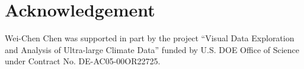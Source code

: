 
\section*{Acknowledgement}

Wei-Chen Chen was supported in part by the project
``Visual Data Exploration and Analysis of Ultra-large Climate Data''
funded by U.S. DOE Office of Science
under Contract No. DE-AC05-00OR22725.
